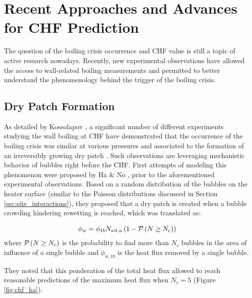 \section{Recent Approaches and Advances for CHF Prediction}
\label{sec:new_chf}


The question of the boiling crisis occurrence and CHF value is still a topic of active research nowadays. Recently, new experimental observations have allowed the access to wall-related boiling measurements \cite{kossolapov_experimental_2021, richenderfer_experimental_2018, bloch_study_2016} and permitted to better understand the phenomenology behind the trigger of the boiling crisis.

\npar

\subsection{Dry Patch Formation}

As detailed by Kossolapov \cite{kossolapov_experimental_2021}, a significant number of different experiments studying the wall boiling at CHF have demonstrated that the occurrence of the boiling crisis was similar at various pressures and associated to the formation of an irreversibly growing dry patch \cite{kossolapov_experimental_2021, richenderfer_experimental_2018}. Such observations are leveraging mechanistic behavior of bubbles right before the CHF. First attempts of modeling this phenomenon were proposed by Ha \& No \cite{ha_dry-spot_1998}, prior to the aforementioned experimental observations. Based on a random distribution of the bubbles on the heater surface (similar to the Poisson distributions discussed in Section \ref{sec:site_interactions}), they proposed that a dry patch is created when a bubble crowding hindering rewetting is reached, which was translated as:

\begin{equation}
\phi_{w} = \phi_{1b}N_{sit,a} \left( 1 - \mathcal{P}\left( N \geq N_{c} \right) \right)
\end{equation}
where $\mathcal{P}\left( N \geq N_{c} \right)$ is the probability to find more than $N_{c}$ bubbles in the area of influence of a single bubble and $\phi_{w,1b}$ is the heat flux removed by a single bubble.

\npar

They noted that this ponderation of the total heat flux allowed to reach reasonable predictions of the maximum heat flux when $N_{c}=5$ (Figure \ref{fig:chf_ha}).



